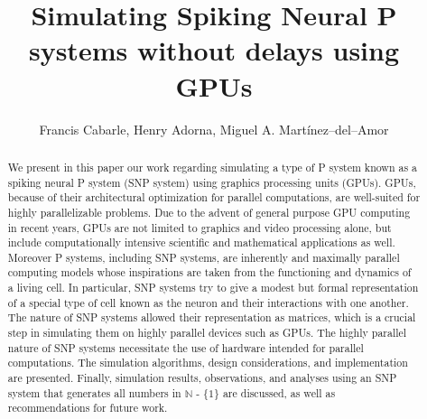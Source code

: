 \documentclass{svmultm}
\begin{document}
\title*{Simulating Spiking Neural P systems without delays using GPUs } %
\author{Francis Cabarle, Henry Adorna, Miguel A. Mart\'inez--del--Amor}
\date{}

\maketitle

 
\begin{abstract}


We present in this paper our work regarding simulating a type of P system known as a spiking neural P system (SNP system) using graphics processing units (GPUs). GPUs, because of their architectural optimization for parallel computations, are well-suited for highly parallelizable problems. Due to the advent of general purpose GPU computing in recent years, GPUs are not limited to graphics and video processing alone, but include computationally intensive scientific and mathematical applications as well. Moreover P systems, including SNP systems, are inherently and maximally parallel computing models whose inspirations are taken from the functioning and dynamics of a living cell. In particular, SNP systems try to give a modest but formal representation of a special type of cell known as the neuron and their interactions with one another. The nature of SNP systems allowed their representation as matrices, which is a crucial step in simulating them on highly parallel devices such as GPUs. The highly parallel nature of SNP systems necessitate the use of hardware intended for parallel computations. The simulation algorithms, design considerations, and implementation are presented. Finally, simulation results, observations, and analyses using an SNP system that generates all numbers in $\mathbb N$ - \{$1$\} are discussed, as well as recommendations for future work. 

\end{abstract}
\end{document}
